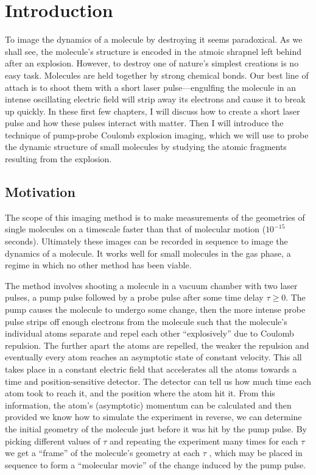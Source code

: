 \chapter{Introduction}\label{ch:introduction}

To image the dynamics of a molecule by destroying it seems paradoxical. As we shall see, the molecule's structure is encoded in the atmoic shrapnel left behind after an explosion. However, to destroy one of nature's simplest creations is no easy task. Molecules are held together by strong chemical bonds. Our best line of attach is to shoot them with a short laser pulse---engulfing the molecule in an intense oscillating electric field will strip away its electrons and cause it to break up quickly. In these first few chapters, I will discuss how to create a short laser pulse and how these pulses interact with matter. Then I will introduce the technique of pump-probe Coulomb explosion imaging, which we will use to probe the dynamic structure of small molecules by studying the atomic fragments resulting from the explosion.

\section{Motivation}
The scope of this imaging method is to make measurements of the geometries of single molecules on a timescale faster than that of molecular motion ($10^{-15}$ seconds). Ultimately these images can be recorded in sequence to image the dynamics of a molecule. It works well for small molecules in the gas phase, a regime in which no other method has been viable.

The method involves shooting a molecule in a vacuum chamber with two laser pulses, a pump pulse followed by a probe pulse after some time delay $\tau \ge 0$. The pump causes the molecule to undergo some change, then the more intense probe pulse strips off enough electrons from the molecule such that the molecule's individual atoms separate and repel each other ``explosively'' due to Coulomb repulsion. The further apart the atoms are repelled, the weaker the repulsion and eventually every atom reaches an asymptotic state of constant velocity. This all takes place in a constant electric field that accelerates all the atoms towards a time and position-sensitive detector. The detector can tell us how much time each atom took to reach it, and the position where the atom hit it. From this information, the atom’s (asymptotic) momentum can be calculated and then provided we know how to simulate the experiment in reverse, we can determine the initial geometry of the molecule just before it was hit by the pump pulse. By picking different values of $\tau$ and repeating the experiment many times for each $\tau$ we get a ``frame'' of the molecule's geometry at each $\tau$ , which may be placed in sequence to form a ``molecular movie'' of the change induced by the pump pulse.

